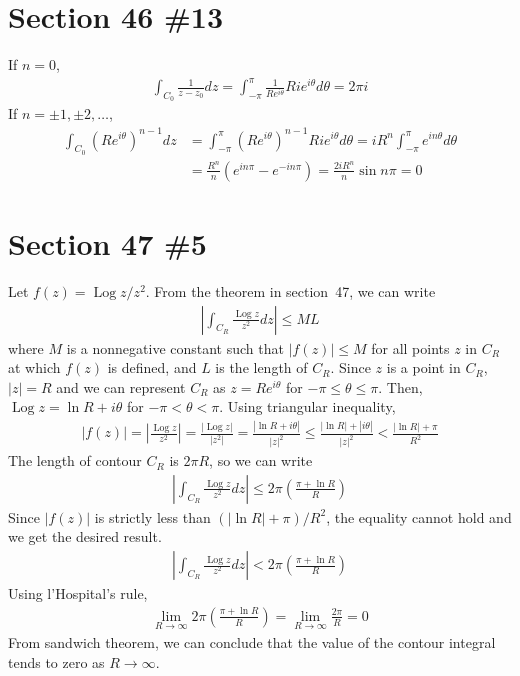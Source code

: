 \documentclass{scrartcl}
\begin{document}
\section{Section 46 \#13}
If \(n = 0\),
\begin{align*}
  \int_{C_0} \frac{1}{z - z_0} dz = \int^\pi_{-\pi} \frac{1}{Re^{i\theta}} Rie^{i\theta} d\theta = 2\pi i
\end{align*}
If \(n = \pm 1, \pm 2, \dots\),
\begin{align*}
  \int_{C_0} (Re^{i\theta})^{n - 1} dz &= \int^\pi_{-\pi} (Re^{i\theta})^{n - 1} Rie^{i\theta} d\theta = iR^n \int^\pi_{-\pi} e^{in\theta} d\theta \\
                                       &= \frac{R^n}{n} (e^{in\pi} - e^{-in\pi}) = \frac{2iR^n}{n} \sin n\pi = 0
\end{align*}

\section{Section 47 \#5}
Let \(f(z) = \operatorname{Log} z / z^2\).
From the theorem in section~47, we can write
\begin{align*}
  \left| \int_{C_R} \frac{\operatorname{Log} z}{z^2} dz \right| \leq ML
\end{align*}
where \(M\) is a nonnegative constant such that \(|f(z)| \leq M\) for all points \(z\) in \(C_R\) at which \(f(z)\) is defined, and \(L\) is the length of \(C_R\).
Since \(z\) is a point in \(C_R\), \(|z| = R\) and we can represent \(C_R\) as \(z = Re^{i\theta}\) for \(-\pi \leq \theta \leq \pi\).
Then, \(\operatorname{Log} z = \ln R + i\theta\) for \(-\pi < \theta < \pi\).
Using triangular inequality,
\begin{align}\label{sec5_ineq}
  |f(z)| = \left| \frac{\operatorname{Log} z}{z^2} \right| = \frac{|\operatorname{Log} z|}{|z^2|} = \frac{|\ln R + i\theta|}{|z|^2} \leq \frac{|\ln R| + |i\theta|}{|z|^2} < \frac{|\ln R| + \pi}{R^2}
\end{align}
The length of contour \(C_R\) is \(2\pi R\), so we can write
\begin{align*}
  \left| \int_{C_R} \frac{\operatorname{Log} z}{z^2} dz \right| \leq 2\pi \left( \frac{\pi + \ln R}{R} \right)
\end{align*}
Since \(|f(z)|\) is strictly less than \((|\ln R| + \pi) / R^2\), the equality cannot hold and we get the desired result.
\begin{align*}
  \left| \int_{C_R} \frac{\operatorname{Log} z}{z^2} dz \right| < 2\pi \left( \frac{\pi + \ln R}{R} \right)
\end{align*}
Using l'Hospital's rule,
\begin{align*}
  \lim_{R \to \infty} 2\pi \left( \frac{\pi + \ln R}{R} \right) = \lim_{R \to \infty} \frac{2\pi}{R} = 0
\end{align*}
From sandwich theorem, we can conclude that the value of the contour integral tends to zero as \(R \to \infty\).
\end{document}

